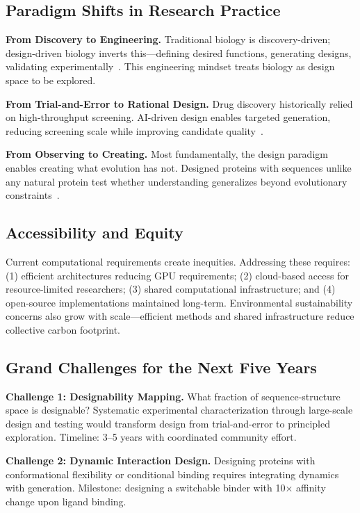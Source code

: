 \subsection{Paradigm Shifts in Research Practice}

\textbf{From Discovery to Engineering.} Traditional biology is discovery-driven; design-driven biology inverts this---defining desired functions, generating designs, validating experimentally~\cite{bennett2024symmetric}. This engineering mindset treats biology as design space to be explored.

\textbf{From Trial-and-Error to Rational Design.} Drug discovery historically relied on high-throughput screening. AI-driven design enables targeted generation, reducing screening scale while improving candidate quality~\cite{zambaldi2024alphaproteo}.

\textbf{From Observing to Creating.} Most fundamentally, the design paradigm enables creating what evolution has not. Designed proteins with sequences unlike any natural protein test whether understanding generalizes beyond evolutionary constraints~\cite{ingraham2023chroma}.

\subsection{Accessibility and Equity}

Current computational requirements create inequities. Addressing these requires: (1) efficient architectures reducing GPU requirements; (2) cloud-based access for resource-limited researchers; (3) shared computational infrastructure; and (4) open-source implementations maintained long-term. Environmental sustainability concerns also grow with scale---efficient methods and shared infrastructure reduce collective carbon footprint.

\subsection{Grand Challenges for the Next Five Years}

\textbf{Challenge 1: Designability Mapping.} What fraction of sequence-structure space is designable? Systematic experimental characterization through large-scale design and testing would transform design from trial-and-error to principled exploration. Timeline: 3--5 years with coordinated community effort.

\textbf{Challenge 2: Dynamic Interaction Design.} Designing proteins with conformational flexibility or conditional binding requires integrating dynamics with generation. Milestone: designing a switchable binder with 10$\times$ affinity change upon ligand binding.

